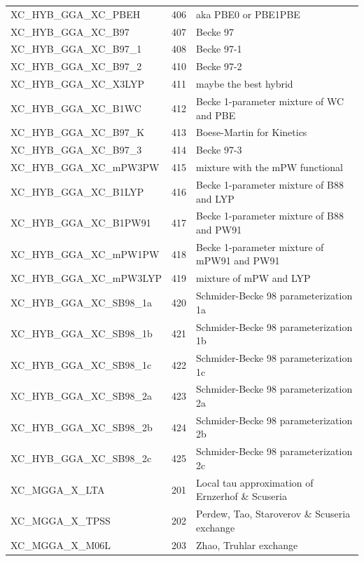 \documentclass[a4paper,11pt]{report}
\begin{document}
\begin{longtable}{lrl}
   XC\_HYB\_GGA\_XC\_PBEH     & 406  &  aka PBE0 or PBE1PBE \\
   XC\_HYB\_GGA\_XC\_B97      & 407  &  Becke 97                                 \\
   XC\_HYB\_GGA\_XC\_B97\_1   & 408  &  Becke 97-1                               \\
   XC\_HYB\_GGA\_XC\_B97\_2   & 410  &  Becke 97-2                               \\
   XC\_HYB\_GGA\_XC\_X3LYP    & 411  &  maybe the best hybrid \\
   XC\_HYB\_GGA\_XC\_B1WC     & 412  &  Becke 1-parameter mixture of WC and PBE \\
   XC\_HYB\_GGA\_XC\_B97\_K   & 413  &  Boese-Martin for Kinetics                \\
   XC\_HYB\_GGA\_XC\_B97\_3   & 414  &  Becke 97-3                               \\
   XC\_HYB\_GGA\_XC\_mPW3PW   & 415  &  mixture with the mPW functional \\
   XC\_HYB\_GGA\_XC\_B1LYP    & 416  &  Becke 1-parameter mixture of B88 and LYP \\
   XC\_HYB\_GGA\_XC\_B1PW91   & 417  &  Becke 1-parameter mixture of B88 and PW91 \\
   XC\_HYB\_GGA\_XC\_mPW1PW   & 418  &  Becke 1-parameter mixture of mPW91 and PW91 \\
   XC\_HYB\_GGA\_XC\_mPW3LYP  & 419  &  mixture of mPW and LYP \\
   XC\_HYB\_GGA\_XC\_SB98\_1a & 420  &  Schmider-Becke 98 parameterization 1a    \\
   XC\_HYB\_GGA\_XC\_SB98\_1b & 421  &  Schmider-Becke 98 parameterization 1b    \\
   XC\_HYB\_GGA\_XC\_SB98\_1c & 422  &  Schmider-Becke 98 parameterization 1c    \\
   XC\_HYB\_GGA\_XC\_SB98\_2a & 423  &  Schmider-Becke 98 parameterization 2a    \\
   XC\_HYB\_GGA\_XC\_SB98\_2b & 424  &  Schmider-Becke 98 parameterization 2b    \\
   XC\_HYB\_GGA\_XC\_SB98\_2c & 425  &  Schmider-Becke 98 parameterization 2c    \\
   XC\_MGGA\_X\_LTA           & 201  &  Local tau approximation of Ernzerhof \& Scuseria \\
   XC\_MGGA\_X\_TPSS          & 202  &  Perdew, Tao, Staroverov \& Scuseria exchange \\
   XC\_MGGA\_X\_M06L          & 203  &  Zhao, Truhlar exchange \\

\end{longtable}
\end{document}

